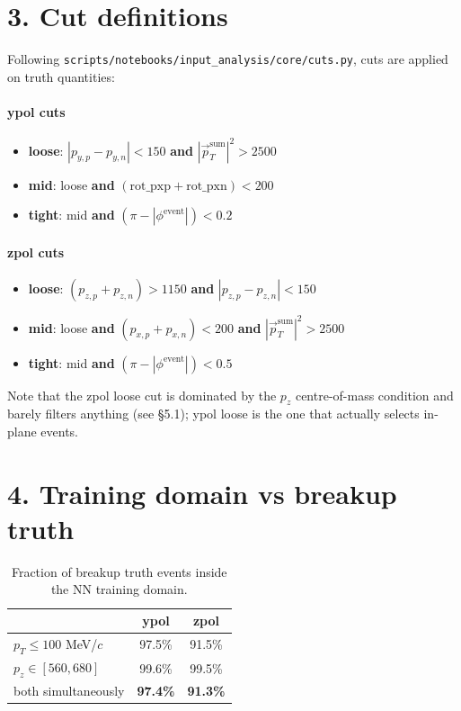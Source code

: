 \documentclass[a4paper,11pt]{article}
\begin{document}
\section{3. Cut definitions}

Following \texttt{scripts/notebooks/input\_analysis/core/cuts.py}, cuts are applied on truth quantities:

\paragraph{ypol cuts}
\begin{itemize}[nosep]
    \item \textbf{loose}: $|p_{y,p} - p_{y,n}| < 150$ \textbf{and} $|\vec p_T^\text{sum}|^2 > 2500$
    \item \textbf{mid}:   loose \textbf{and} $(\text{rot\_pxp} + \text{rot\_pxn}) < 200$
    \item \textbf{tight}: mid \textbf{and} $(\pi - |\phi^\text{event}|) < 0.2$
\end{itemize}

\paragraph{zpol cuts}
\begin{itemize}[nosep]
    \item \textbf{loose}: $(p_{z,p} + p_{z,n}) > 1150$ \textbf{and} $|p_{z,p} - p_{z,n}| < 150$
    \item \textbf{mid}:   loose \textbf{and} $(p_{x,p} + p_{x,n}) < 200$ \textbf{and} $|\vec p_T^\text{sum}|^2 > 2500$
    \item \textbf{tight}: mid \textbf{and} $(\pi - |\phi^\text{event}|) < 0.5$
\end{itemize}

Note that the zpol loose cut is dominated by the $p_z$ centre-of-mass condition and barely filters anything (see \S5.1); ypol loose is the one that actually selects in-plane events.

\section{4. Training domain vs breakup truth}

\begin{table}[H]
\centering\footnotesize
\caption{Fraction of breakup truth events inside the NN training domain.}
\begin{tabular}{lcc}
\toprule
                         & ypol & zpol \\
\midrule
$p_T \le 100$ MeV/$c$    & 97.5\% & 91.5\% \\
$p_z \in [560, 680]$     & 99.6\% & 99.5\% \\
both simultaneously      & \textbf{97.4\%} & \textbf{91.3\%} \\
\bottomrule
\end{tabular}
\end{table}
\end{document}
